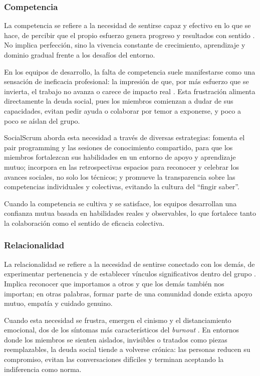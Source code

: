 \subsubsection{Competencia}

La competencia se refiere a la necesidad de sentirse capaz y efectivo en lo que se hace, de percibir que el propio esfuerzo genera progreso y resultados con sentido \cite{ryan_self-determination_2000}.
No implica perfección, sino la vivencia constante de crecimiento, aprendizaje y dominio gradual frente a los desafíos del entorno.

En los equipos de desarrollo, la falta de competencia suele manifestarse como una sensación de ineficacia profesional: la impresión de que, por más esfuerzo que se invierta, el trabajo no avanza o carece de impacto real \cite{tulili2022burnout}.
Esta frustración alimenta directamente la deuda social, pues los miembros comienzan a dudar de sus capacidades, evitan pedir ayuda o colaborar por temor a exponerse, y poco a poco se aíslan del grupo.

SocialScrum aborda esta necesidad a través de diversas estrategias: fomenta el pair programming y las sesiones de conocimiento compartido, para que los miembros fortalezcan sus habilidades en un entorno de apoyo y aprendizaje mutuo; incorpora en las retrospectivas espacios para reconocer y celebrar los avances sociales, no solo los técnicos; y promueve la transparencia sobre las competencias individuales y colectivas, evitando la cultura del ``fingir saber''.

Cuando la competencia se cultiva y se satisface, los equipos desarrollan una confianza mutua basada en habilidades reales y observables, lo que fortalece tanto la colaboración como el sentido de eficacia colectiva.

\subsubsection{Relacionalidad}

La relacionalidad se refiere a la necesidad de sentirse conectado con los demás, de experimentar pertenencia y de establecer vínculos significativos dentro del grupo \cite{ryan_self-determination_2000}.
Implica reconocer que importamos a otros y que los demás también nos importan; en otras palabras, formar parte de una comunidad donde exista apoyo mutuo, empatía y cuidado genuino.

Cuando esta necesidad se frustra, emergen el cinismo y el distanciamiento emocional, dos de los síntomas más característicos del \textit{burnout} \cite{tulili2022burnout}.
En entornos donde los miembros se sienten aislados, invisibles o tratados como piezas reemplazables, la deuda social tiende a volverse crónica: las personas reducen su compromiso, evitan las conversaciones difíciles y terminan aceptando la indiferencia como norma.

